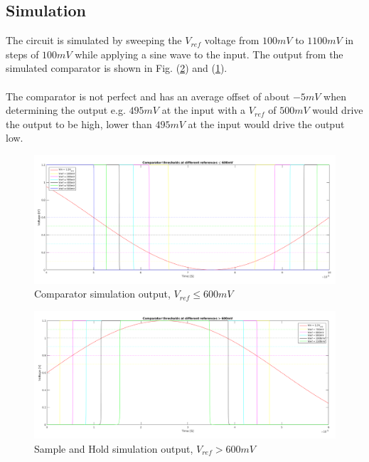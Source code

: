 \documentclass[english, 12pt, a4paper]{ifimaster}
\begin{document}
\subsection{Simulation}
The circuit is simulated by sweeping the \(V_{ref}\) voltage from \(100 mV\) to \(1100 mV\) in steps of \(100 mV\) while applying a sine wave to the input.
The output from the simulated comparator is shown in Fig. (\ref{figure:comparator:sim_output_greater}) and (\ref{figure:comparator:sim_output_less}).\\
\\
The comparator is not perfect and has an average offset of about \(-5 mV\) when determining the output e.g. \(495 mV\) at the input with a \(V_{ref}\) of \(500 mV\) would drive the output to be high,
lower than \(495 mV\) at the input would drive the output low.\\

\begin{figure}[!ht]
    \centering
    \includegraphics[width=\textwidth]{img/comparator/comparator_r2r_less_600m_10k_scaled}
    \caption{Comparator simulation output, \(V_{ref} \leq 600mV\) }
    \label{figure:comparator:sim_output_less}
\end{figure}

\begin{figure}[!ht]
    \centering
    \includegraphics[width=\textwidth]{img/comparator/comparator_r2r_greater_600m_10k_scaled}
    \caption{Sample and Hold simulation output, \(V_{ref} > 600mV\)}
    \label{figure:comparator:sim_output_greater}
\end{figure}
\end{document}
